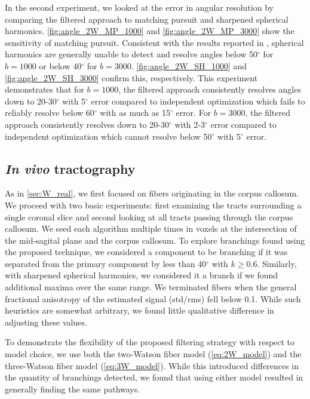 \documentclass[final,hyperref]{gatech-thesis}
\renewcommand{\deg}{\ensuremath{^\circ}\xspace}
\newcommand{\bn}[1]{\ensuremath{b\!=\!#1}\xspace}
\newcommand{\bone}{\bn{1000}}
\newcommand{\bthree}{\bn{3000}}
\begin{document}
In the second experiment, we looked at the error in angular resolution by
comparing the filtered approach to matching pursuit and sharpened spherical
harmonics.  \autoref{fig:angle_2W_MP_1000} and \autoref{fig:angle_2W_MP_3000}
show the sensitivity of matching pursuit.  Consistent with the results
reported in \cite{Descoteaux2009tmi,Descoteaux2007mrm}, spherical harmonics are
generally unable to detect and resolve angles below 50\deg for \bone or below
40\deg for \bthree.  \autoref{fig:angle_2W_SH_1000} and
\autoref{fig:angle_2W_SH_3000} confirm this, respectively.  This experiment
demonstrates that for \bone, the filtered approach consistently resolves
angles down to 20-30\deg with 5\deg error compared to independent optimization
which fails to reliably resolve below 60\deg with as much as 15\deg error.
For \bthree, the filtered approach consistently resolves down to 20-30\deg
with 2-3\deg error compared to independent optimization which cannot resolve
below 50\deg with 5\deg error.






\subsection{\textit{In vivo} tractography}  \label{sec:W_real}

As in \autoref{sec:W_real}, we first focused on fibers originating in the corpus
callosum.  We proceed with two basic experiments:  first examining the tracts
surrounding a single coronal slice and second looking at all tracts passing
through the corpus callosum.  We seed each algorithm multiple times in voxels
at the intersection of the mid-sagital plane and the corpus callosum.  To
explore branchings found using the proposed technique, we considered a
component to be branching if it was separated from the primary component by
less than 40\deg with $k\ge0.6$.  Similarly, with sharpened spherical
harmonics, we considered it a branch if we found additional maxima over the
same range.  We terminated fibers when the general fractional anisotropy of
the estimated signal (std/rms) fell below 0.1.  While such heuristics are
somewhat arbitrary, we found little qualitative difference in adjusting these
values.

To demonstrate the flexibility of the proposed filtering strategy with respect
to model choice, we use both the two-Watson fiber model
(\autoref{eq:2W_model}) and the three-Watson fiber model
(\autoref{eq:3W_model}).  While this introduced differences in the quantity of
branchings detected, we found that using either model resulted in generally
finding the same pathways.
\end{document}

